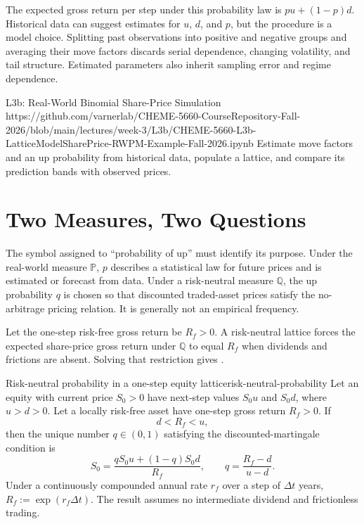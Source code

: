 \documentclass[11pt]{article}
\newcommand{\Pmeasure}{\mathbb{P}}
\newcommand{\Qmeasure}{\mathbb{Q}}
\begin{document}
The expected gross return per step under this probability law is $pu+(1-p)d$. Historical data can suggest estimates for $u$, $d$, and $p$, but the procedure is a model choice. Splitting past observations into positive and negative groups and averaging their move factors discards serial dependence, changing volatility, and tail structure. Estimated parameters also inherit sampling error and regime dependence.

\notebooklink
  {L3b: Real-World Binomial Share-Price Simulation}
  {https://github.com/varnerlab/CHEME-5660-CourseRepository-Fall-2026/blob/main/lectures/week-3/L3b/CHEME-5660-L3b-LatticeModelSharePrice-RWPM-Example-Fall-2026.ipynb}
  {Estimate move factors and an up probability from historical data, populate a lattice, and compare its prediction bands with observed prices.}

\section{Two Measures, Two Questions}

The symbol assigned to ``probability of up'' must identify its purpose. Under the real-world measure $\Pmeasure$, $p$ describes a statistical law for future prices and is estimated or forecast from data. Under a risk-neutral measure $\Qmeasure$, the up probability $q$ is chosen so that discounted traded-asset prices satisfy the no-arbitrage pricing relation. It is generally not an empirical frequency.

Let the one-step risk-free gross return be $R_f>0$. A risk-neutral lattice forces the expected share-price gross return under $\Qmeasure$ to equal $R_f$ when dividends and frictions are absent. Solving that restriction gives .

\begin{theorem}{Risk-neutral probability in a one-step equity lattice}{risk-neutral-probability}
Let an equity with current price $S_0>0$ have next-step values $S_0u$ and $S_0d$, where $u>d>0$. Let a locally risk-free asset have one-step gross return $R_f>0$. If
\begin{equation}
  \label{eq:no-arbitrage-bounds}
  d<R_f<u,
\end{equation}
then the unique number $q\in(0,1)$ satisfying the discounted-martingale condition is
\begin{equation}
  \label{eq:risk-neutral-probability}
  S_0=\frac{qS_0u+(1-q)S_0d}{R_f},
  \qquad
  q=\frac{R_f-d}{u-d}.
\end{equation}
Under a continuously compounded annual rate $r_f$ over a step of $\Delta t$ years, $R_f:=\exp(r_f\Delta t)$. The result assumes no intermediate dividend and frictionless trading.
\end{theorem}
\end{document}
